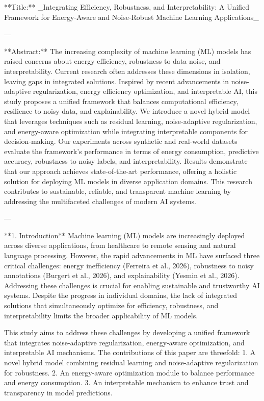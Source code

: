 **Title:**  
_Integrating Efficiency, Robustness, and Interpretability: A Unified Framework for Energy-Aware and Noise-Robust Machine Learning Applications_

---

**Abstract:**  
The increasing complexity of machine learning (ML) models has raised concerns about energy efficiency, robustness to data noise, and interpretability. Current research often addresses these dimensions in isolation, leaving gaps in integrated solutions. Inspired by recent advancements in noise-adaptive regularization, energy efficiency optimization, and interpretable AI, this study proposes a unified framework that balances computational efficiency, resilience to noisy data, and explainability. We introduce a novel hybrid model that leverages techniques such as residual learning, noise-adaptive regularization, and energy-aware optimization while integrating interpretable components for decision-making. Our experiments across synthetic and real-world datasets evaluate the framework's performance in terms of energy consumption, predictive accuracy, robustness to noisy labels, and interpretability. Results demonstrate that our approach achieves state-of-the-art performance, offering a holistic solution for deploying ML models in diverse application domains. This research contributes to sustainable, reliable, and transparent machine learning by addressing the multifaceted challenges of modern AI systems.

---

**1. Introduction**  
Machine learning (ML) models are increasingly deployed across diverse applications, from healthcare to remote sensing and natural language processing. However, the rapid advancements in ML have surfaced three critical challenges: energy inefficiency (Ferreira et al., 2026), robustness to noisy annotations (Burgert et al., 2026), and explainability (Yesmin et al., 2026). Addressing these challenges is crucial for enabling sustainable and trustworthy AI systems. Despite the progress in individual domains, the lack of integrated solutions that simultaneously optimize for efficiency, robustness, and interpretability limits the broader applicability of ML models.

This study aims to address these challenges by developing a unified framework that integrates noise-adaptive regularization, energy-aware optimization, and interpretable AI mechanisms. The contributions of this paper are threefold:  
1. A novel hybrid model combining residual learning and noise-adaptive regularization for robustness.  
2. An energy-aware optimization module to balance performance and energy consumption.  
3. An interpretable mechanism to enhance trust and transparency in model predictions.

